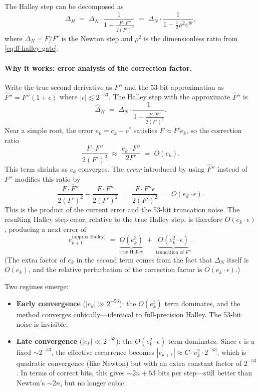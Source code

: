 The Halley step can be decomposed as
\begin{equation}\label{eq:ff-halley-decomp}
\Delta_H \;=\; \Delta_N \cdot \frac{1}{1 - \frac{F \cdot F''}{2(F')^2}}
\;=\; \Delta_N \cdot \frac{1}{1 - \tfrac{1}{2}\rho^2 e^{i\theta}},
\end{equation}
where $\Delta_N = F/F'$ is the Newton step and $\rho^2$ is the dimensionless
ratio from \cref{eq:ff-halley-gate}.

\paragraph{Why it works: error analysis of the correction factor.}
Write the true second derivative as $F''$ and the 53-bit approximation as
$\hat{F}'' = F''(1 + \epsilon)$ where $|\epsilon| \lesssim 2^{-53}$.  The
Halley step with the approximate $\hat{F}''$ is
\[
\hat{\Delta}_H \;=\; \Delta_N \cdot
  \frac{1}{1 - \frac{F \cdot \hat{F}''}{2(F')^2}}.
\]
Near a simple root, the error $e_k = c_k - c^*$ satisfies $F \approx F' e_k$,
so the correction ratio
\[
\frac{F \cdot F''}{2(F')^2} \;\approx\;
  \frac{e_k \cdot F''}{2 F'} \;=\; O(e_k).
\]
This term shrinks as $c_k$ converges.  The \emph{error} introduced by using
$\hat{F}''$ instead of $F''$ modifies this ratio by
\[
\frac{F \cdot \hat{F}''}{2(F')^2}
  - \frac{F \cdot F''}{2(F')^2}
  \;=\; \frac{F \cdot F'' \epsilon}{2(F')^2}
  \;=\; O(e_k \cdot \epsilon).
\]
This is the product of the current error and the 53-bit truncation noise.
The resulting Halley step error, relative to the true Halley step, is therefore
$O(e_k \cdot \epsilon)$, producing a next error of
\[
e_{k+1}^{\text{(approx Halley)}} \;=\;
  \underbrace{O(e_k^3)}_{\text{true Halley}}
  \;+\;
  \underbrace{O(e_k^2 \cdot \epsilon)}_{\text{truncation of } F''}.
\]
(The extra factor of $e_k$ in the second term comes from the fact that
$\Delta_N$ itself is $O(e_k)$, and the relative perturbation of the
correction factor is $O(e_k \cdot \epsilon)$.)

Two regimes emerge:
\begin{itemize}
\item \textbf{Early convergence} ($|e_k| \gg 2^{-53}$): the $O(e_k^3)$ term
  dominates, and the method converges cubically---identical to full-precision
  Halley.  The 53-bit noise is invisible.
\item \textbf{Late convergence} ($|e_k| \ll 2^{-53}$): the
  $O(e_k^2 \cdot \epsilon)$ term dominates.  Since $\epsilon$ is a fixed
  ${\sim}2^{-53}$, the effective recurrence becomes $|e_{k+1}| \approx
  C \cdot e_k^2 \cdot 2^{-53}$, which is quadratic convergence (like Newton)
  but with an extra constant factor of $2^{-53}$.  In terms of correct bits,
  this gives ${\sim}2n + 53$ bits per step---still better than Newton's
  ${\sim}2n$, but no longer cubic.
\end{itemize}

